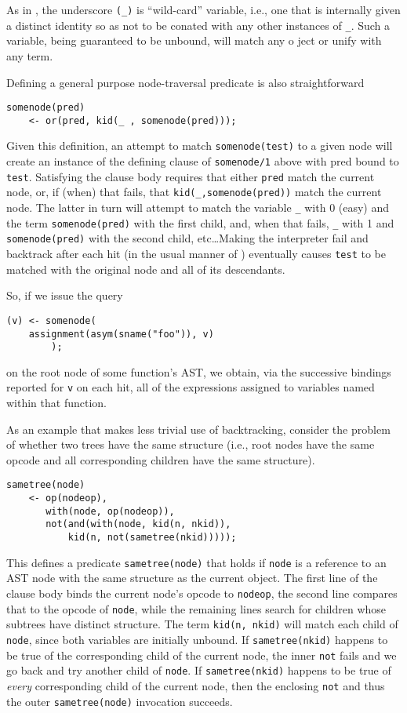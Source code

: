 As in \prolog, the underscore \verb|(_)| is ``wild-card'' variable, i.e., one
that is internally given a distinct identity so as not to be conated with any
other instances of \verb|_|. Such a variable, being guaranteed to be unbound,
will match any o ject or unify with any term.

Defining a general purpose node-traversal predicate is also straightforward
\begin{verbatim}
somenode(pred)
    <- or(pred, kid(_ , somenode(pred)));
\end{verbatim}
Given this definition, an attempt to match \verb|somenode(test)| to a given node
will create an instance of the defining clause of \verb|somenode/1| above with
pred bound to \verb|test|. Satisfying the clause body requires that either
\verb|pred| match the current node, or, if (when) that fails, that
\verb|kid(_,somenode(pred))| match the current node. The latter in turn will
attempt to match the variable \verb|_| with 0 (easy) and the term
\verb|somenode(pred)| with the first child, and, when that fails, \verb|_| with
1 and \verb|somenode(pred)| with the second child, etc\ldots Making the
interpreter fail and backtrack after each hit (in the usual manner of \prolog)
eventually causes \verb|test| to be matched with the original node and all of
its descendants.

So, if we issue the query
\begin{verbatim}
(v) <- somenode(
    assignment(asym(sname("foo")), v)
        );
\end{verbatim}
on the root node of some function's AST, we obtain, via the successive bindings
reported for \verb|v| on each hit, all of the expressions assigned to variables
named  within that function.

As an example that makes less trivial use of backtracking, consider the problem
of whether two trees have the same structure (i.e., root nodes have the same
opcode and all corresponding children have the same structure).
\begin{verbatim}
sametree(node)
    <- op(nodeop),
       with(node, op(nodeop)),
       not(and(with(node, kid(n, nkid)),
           kid(n, not(sametree(nkid)))));
\end{verbatim}

This defines a predicate \verb|sametree(node)| that holds if \verb|node| is a
reference to an AST node with the same structure as the current object. The
first line of the clause body binds the current node's opcode to \verb|nodeop|,
the second line compares that to the opcode of \verb|node|, while the remaining
lines search for children whose subtrees have distinct structure. The term
\verb|kid(n, nkid)| will match each child of \verb|node|, since both variables
are initially unbound. If \verb|sametree(nkid)| happens to be true of the
corresponding child of the current node, the inner \verb|not| fails and we go
back and try another child of \verb|node|. If \verb|sametree(nkid)| happens to
be true of \emph{every} corresponding child of the current node, then the
enclosing \verb|not| and thus the outer \verb|sametree(node)| invocation
succeeds.

